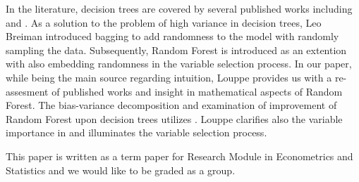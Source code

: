 In the literature, 
decision trees are covered by several published works including 
\cite{breiman1984classification} and \cite{James2013}.
As a solution to the problem of high variance in decision trees, 
Leo Breiman introduced bagging to add randomness to the model 
with randomly sampling the data\cite{breiman1996bagging}. 
Subsequently, Random Forest is introduced as an extention with 
also embedding randomness in the variable selection process\cite{breiman2001random}. 
In our paper, while \cite{friedman2001elements} being the main source regarding intuition,
Louppe provides us with a re-assesment of published works and insight in 
mathematical aspects of Random Forest\cite{louppe2014understanding}.
The bias-variance decomposition and examination of improvement of Random Forest upon decision trees utilizes 
\cite{james2003variance}\cite{domingos2000decomposition}\cite{friedman1997zeroLoss}\cite{kohavi1996bias}. 
Louppe clarifies also the variable importance in \cite{louppe2013understanding} and 
\cite{kohavi1997importance} illuminates the variable selection process.

This paper is written as a term paper for Research Module in Econometrics and Statistics and 
we would like to be graded as a group.
